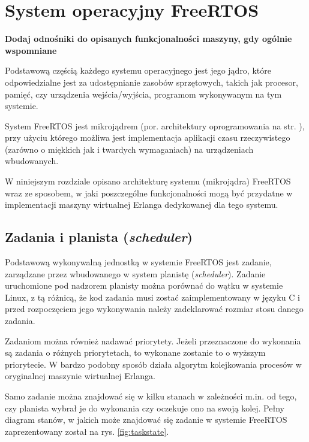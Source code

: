 \chapter{System operacyjny FreeRTOS}
\label{cha:freertos}

\textbf{Dodaj odnośniki do opisanych funkcjonalności maszyny, gdy ogólnie wspomniane}

Podstawową częścią każdego systemu operacyjnego jest jego jądro, które odpowiedzialne jest za udostępnianie zasobów sprzętowych, takich jak procesor, pamięć, czy urządzenia wejścia/wyjścia, programom wykonywanym na tym systemie.

System FreeRTOS jest mikrojądrem (por. architektury oprogramowania na str. \pageref{ref:architektury}), przy użyciu którego możliwa jest implementacja aplikacji czasu rzeczywistego (zarówno o miękkich jak i twardych wymaganiach) na urządzeniach wbudowanych.

W niniejszym rozdziale opisano architekturę systemu (mikrojądra) FreeRTOS wraz ze sposobem, w jaki
poszczególne funkcjonalności mogą być przydatne w implementacji maszyny wirtualnej Erlanga dedykowanej dla tego systemu.

\section{Zadania i planista (\emph{scheduler})}
\label{sec:rtosScheduler}

Podstawową wykonywalną jednostką w systemie FreeRTOS jest zadanie, zarządzane przez wbudowanego w system planistę (\emph{scheduler}).
Zadanie uruchomione pod nadzorem planisty można porównać do wątku w systemie Linux, z tą różnicą, że kod zadania musi zostać zaimplementowany w języku C i przed rozpoczęciem jego wykonywania należy zadeklarować rozmiar stosu danego zadania.

Zadaniom można również nadawać priorytety. Jeżeli przeznaczone do wykonania są zadania o różnych priorytetach, to wykonane zostanie to o wyższym priorytecie. W bardzo podobny sposób działa algorytm kolejkowania procesów w oryginalnej maszynie wirtualnej Erlanga.

Samo zadanie można znajdować się w kilku stanach w zależności m.in. od tego, czy planista wybrał je do wykonania czy oczekuje ono na swoją kolej. Pełny diagram stanów, w jakich może znajdować się zadanie w systemie FreeRTOS zaprezentowany został na rys. \ref{fig:taskstate}.

